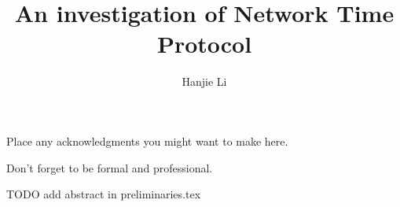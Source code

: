 

\title{An investigation of Network Time Protocol}
\author{Hanjie Li}







\firstThreePages


\Acknowledgments

Place any acknowledgments you might want to make here.

\noindent
Don't forget to be formal and professional.



\tocAndSuch



TODO add abstract in preliminaries.tex


\afterpreface
